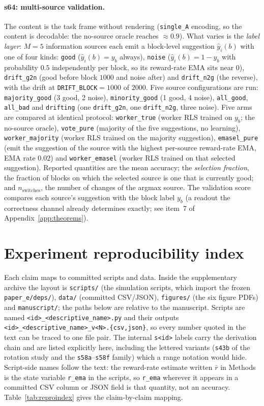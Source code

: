 \documentclass[preprint,12pt]{elsarticle}
\begin{document}
\paragraph{s64: multi-source validation.} The content is the task frame
without rendering (\texttt{single\_A} encoding, so the content is decodable:
the no-source oracle reaches $\approx0.9$). What varies is the \emph{label
layer}: $M=5$ information sources each emit a block-level suggestion
$\hat y_i(b)$ with one of four kinds: \texttt{good} ($\hat y_i(b)=y_b$
always), \texttt{noise} ($\hat y_i(b)=1-y_b$ with probability $0.5$
independently per block, so its reward-rate EMA sits near $0$),
\texttt{drift\_g2n} (good before block $1000$ and noise after) and
\texttt{drift\_n2g} (the reverse), with the drift at
\texttt{DRIFT\_BLOCK}$=1000$ of $2000$. Five source configurations are run:
\texttt{majority\_good} (3 good, 2 noise), \texttt{minority\_good} (1 good,
4 noise), \texttt{all\_good}, \texttt{all\_bad} and \texttt{drifting} (one
\texttt{drift\_g2n}, one \texttt{drift\_n2g}, three noise). Five arms are
compared at identical protocol: \texttt{worker\_true} (worker RLS trained on
$y_b$; the no-source oracle), \texttt{vote\_pure} (majority of the five
suggestions, no learning), \texttt{worker\_majority} (worker RLS trained on
the majority suggestion), \texttt{emasel\_pure} (emit the suggestion of the
source with the highest per-source reward-rate EMA, EMA rate $0.02$) and
\texttt{worker\_emasel} (worker RLS trained on that selected suggestion).
Reported quantities are the mean accuracy; the \emph{selection fraction},
the fraction of blocks on which the selected source is one that is currently
good; and $n_{\mathrm{switches}}$, the number of changes of the argmax
source. The validation score compares each source's suggestion with the
block label $y_b$ (a readout the correctness channel already determines
exactly; see item~7 of Appendix~\ref{app:theorems}).

\section{Experiment reproducibility index}
\label{app:index}

Each claim maps to committed scripts and data. Inside the supplementary
archive the layout is \texttt{scripts/} (the simulation scripts, which import
the frozen \texttt{paper\_e/deps/}), \texttt{data/} (committed CSV/JSON),
\texttt{figures/} (the six figure PDFs) and \texttt{manuscript/}; the paths
below are relative to the manuscript. Scripts are named
\texttt{<id>\_<descriptive\_name>.py} and their outputs
\texttt{<id>\_<descriptive\_name>\_v<N>.\{csv,json\}}, so every number quoted in
the text can be traced to one file pair. The internal \texttt{s<id>} labels
carry the derivation chain and are listed explicitly here, including the
lettered variants (\texttt{s43b} of the rotation study and the
\texttt{s58a}--\texttt{s58f} family) which a range notation would hide.
Script-side names follow the text: the reward-rate estimate written $\bar r$ in
Methods is the state variable \texttt{r\_ema} in the scripts, so \texttt{r\_ema}
wherever it appears in a committed CSV column or JSON field is that
quantity, not an accuracy.
Table~\ref{tab:reproindex} gives the claim-by-claim mapping.
\end{document}
